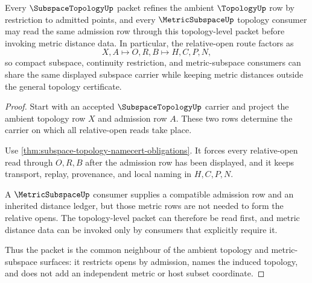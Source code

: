 \begin{theorem}
\label{thm:subspace-topology-neighbour-compatibility}
Every $\SubspaceTopologyUp$ packet refines the ambient $\TopologyUp$ row by restriction to admitted points, and every $\MetricSubspaceUp$ topology consumer may read the same admission row through this topology-level packet before invoking metric distance data. In particular, the relative-open route factors as
$$
X,A \longmapsto O,R,B \longmapsto H,C,P,N ,
$$
so compact subspace, continuity restriction, and metric-subspace consumers can share the same displayed subspace carrier while keeping metric distances outside the general topology certificate.
\end{theorem}
\begin{proof}
Start with an accepted $\SubspaceTopologyUp$ carrier and project the ambient topology row $X$ and admission row $A$. These two rows determine the carrier on which all relative-open reads take place.

Use \autoref{thm:subspace-topology-namecert-obligations}. It forces every relative-open read through $O,R,B$ after the admission row has been displayed, and it keeps transport, replay, provenance, and local naming in $H,C,P,N$.

A $\MetricSubspaceUp$ consumer supplies a compatible admission row and an inherited distance ledger, but those metric rows are not needed to form the relative opens. The topology-level packet can therefore be read first, and metric distance data can be invoked only by consumers that explicitly require it.

Thus the packet is the common neighbour of the ambient topology and metric-subspace surfaces: it restricts opens by admission, names the induced topology, and does not add an independent metric or host subset coordinate.
\end{proof}

